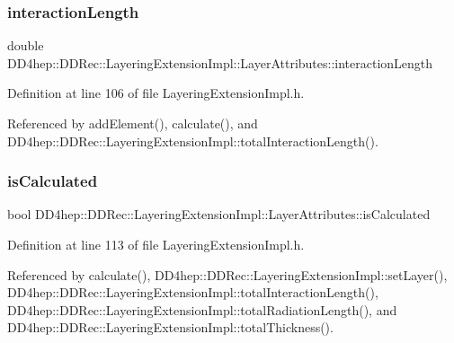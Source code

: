 \subsubsection{\texorpdfstring{interaction\+Length}{interactionLength}}
{\footnotesize\ttfamily double D\+D4hep\+::\+D\+D\+Rec\+::\+Layering\+Extension\+Impl\+::\+Layer\+Attributes\+::interaction\+Length}



Definition at line 106 of file Layering\+Extension\+Impl.\+h.



Referenced by add\+Element(), calculate(), and D\+D4hep\+::\+D\+D\+Rec\+::\+Layering\+Extension\+Impl\+::total\+Interaction\+Length().

\hypertarget{struct_d_d4hep_1_1_d_d_rec_1_1_layering_extension_impl_1_1_layer_attributes_a0ddd6974f8568e8b28e3a258384ac582}{}\label{struct_d_d4hep_1_1_d_d_rec_1_1_layering_extension_impl_1_1_layer_attributes_a0ddd6974f8568e8b28e3a258384ac582} 
\subsubsection{\texorpdfstring{is\+Calculated}{isCalculated}}
{\footnotesize\ttfamily bool D\+D4hep\+::\+D\+D\+Rec\+::\+Layering\+Extension\+Impl\+::\+Layer\+Attributes\+::is\+Calculated}



Definition at line 113 of file Layering\+Extension\+Impl.\+h.



Referenced by calculate(), D\+D4hep\+::\+D\+D\+Rec\+::\+Layering\+Extension\+Impl\+::set\+Layer(), D\+D4hep\+::\+D\+D\+Rec\+::\+Layering\+Extension\+Impl\+::total\+Interaction\+Length(), D\+D4hep\+::\+D\+D\+Rec\+::\+Layering\+Extension\+Impl\+::total\+Radiation\+Length(), and D\+D4hep\+::\+D\+D\+Rec\+::\+Layering\+Extension\+Impl\+::total\+Thickness().

\hypertarget{struct_d_d4hep_1_1_d_d_rec_1_1_layering_extension_impl_1_1_layer_attributes_af0bbd3d9f7b9b1297b6cc79deaf05147}{}\label{struct_d_d4hep_1_1_d_d_rec_1_1_layering_extension_impl_1_1_layer_attributes_af0bbd3d9f7b9b1297b6cc79deaf05147} 
